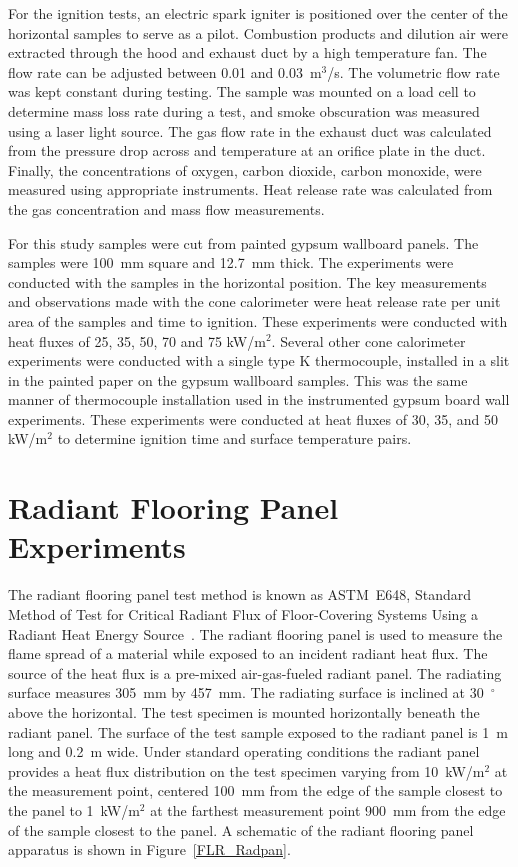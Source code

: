 \documentclass[twoside]{uocthesis}
\begin{document}
For the ignition tests, an electric spark igniter is positioned over the center of the horizontal samples to serve as a pilot.  Combustion products and dilution air were extracted through the hood and exhaust duct by a high temperature fan. The flow rate can be adjusted between 0.01 and 0.03~m$^3$/s. The volumetric flow rate was kept constant during testing. The sample was mounted on a load cell to determine mass loss rate during a test, and smoke obscuration was measured using a laser light source. The gas flow rate in the exhaust duct was calculated from the pressure drop across and temperature at an orifice plate in the duct. Finally, the concentrations of oxygen, carbon dioxide, carbon monoxide, were measured using appropriate instruments. Heat release rate was calculated from the gas concentration and mass flow measurements.

For this study samples were cut from painted gypsum wallboard panels. The samples were 100~mm square and 12.7~mm thick. The experiments were conducted with the samples in the horizontal position.  The key measurements and observations made with the cone calorimeter were heat release rate per unit area of the samples and time to ignition. These experiments were conducted with heat fluxes of 25, 35, 50, 70 and 75 kW/m$^2$. Several other cone calorimeter experiments were conducted with a single type K thermocouple, installed in a slit in the painted paper on the gypsum wallboard samples.  This was the same manner of thermocouple installation used in the instrumented gypsum board wall experiments.  These experiments were conducted at heat fluxes of 30, 35, and 50 kW/m$^2$ to determine ignition time and surface temperature pairs.

\section{Radiant Flooring Panel Experiments}

The radiant flooring panel test method is known as ASTM~E648, Standard Method of Test for Critical Radiant Flux of Floor-Covering Systems Using a Radiant Heat Energy Source~\cite{ASTM_E648}.  The radiant flooring panel is used to measure the flame spread of a material while exposed to an incident radiant heat flux. The source of the heat flux is a pre-mixed air-gas-fueled radiant panel.  The radiating surface measures 305~mm by 457~mm. The radiating surface is inclined at 30~$^{\circ}$ above the horizontal. The test specimen is mounted horizontally beneath the radiant panel.  The surface of the test sample exposed to the radiant panel is 1~m long and 0.2~m wide. Under standard operating conditions the radiant panel provides a heat flux distribution on the test specimen varying from 10~kW/m$^2$ at the measurement point, centered 100~mm from the edge of the sample closest to the panel to 1~kW/m$^2$ at the farthest measurement point 900~mm from the edge of the sample closest to the panel. A schematic of the radiant flooring panel apparatus is shown in Figure~\ref{FLR_Radpan}.  
\end{document}
